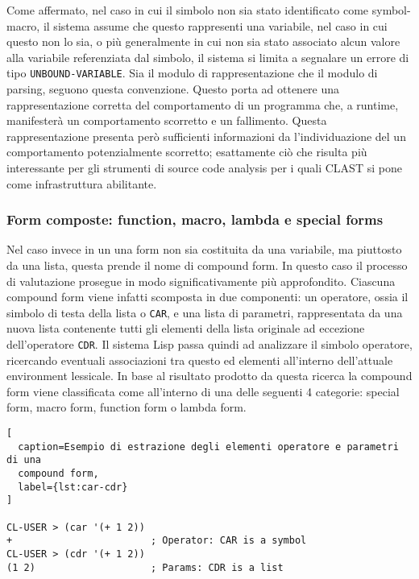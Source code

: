 Come affermato, nel caso in cui il simbolo non sia stato identificato come
symbol-macro, il sistema assume che questo rappresenti una variabile, nel
caso in cui questo non lo sia, o più generalmente in cui non sia stato
associato alcun valore alla variabile referenziata dal simbolo, il sistema si
limita a segnalare un errore di tipo \texttt{UNBOUND-VARIABLE}. Sia il modulo
di rappresentazione che il modulo di parsing, seguono questa convenzione.
Questo porta ad ottenere una rappresentazione corretta del comportamento di un
programma che, a runtime, manifesterà un comportamento scorretto e un
fallimento. Questa rappresentazione presenta però sufficienti informazioni da
l’individuazione del un comportamento potenzialmente scorretto; esattamente
ciò che risulta più interessante per gli strumenti di source code analysis per
i quali CLAST si pone come infrastruttura abilitante.\\

\subsubsection{Form composte: function, macro, lambda e special forms}

Nel caso invece in un una form non sia costituita da una variabile, ma
piuttosto da una lista, questa prende il nome di compound form. In questo caso
il processo di valutazione prosegue in modo significativamente più
approfondito. Ciascuna compound form viene infatti scomposta in due
componenti: un operatore, ossia il simbolo di testa della lista o
\texttt{CAR}, e una lista di parametri, rappresentata da una nuova lista
contenente tutti gli elementi della lista originale ad eccezione
dell’operatore \texttt{CDR}. Il sistema Lisp passa quindi ad analizzare il
simbolo operatore, ricercando eventuali associazioni tra questo ed elementi
all’interno dell’attuale environment lessicale. In base al risultato prodotto
da questa ricerca la compound form viene classificata come all’interno di una
delle seguenti 4 categorie: special form, macro form, function form o lambda
form.

\begin{lstlisting}[
  caption=Esempio di estrazione degli elementi operatore e parametri di una
  compound form,
  label={lst:car-cdr}
]

CL-USER > (car '(+ 1 2))
+                        ; Operator: CAR is a symbol
CL-USER > (cdr '(+ 1 2))
(1 2)                    ; Params: CDR is a list

\end{lstlisting}


